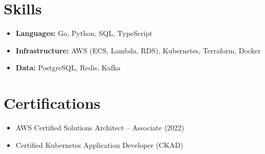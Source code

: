 \documentclass[11pt]{article}
\begin{document}
\section*{Skills}
\begin{itemize}
  \item \textbf{Languages:} Go, Python, SQL, TypeScript
  \item \textbf{Infrastructure:} AWS (ECS, Lambda, RDS), Kubernetes, Terraform, Docker
  \item \textbf{Data:} PostgreSQL, Redis, Kafka
\end{itemize}

\section*{Certifications}
\begin{itemize}
  \item AWS Certified Solutions Architect -- Associate (2022)
  \item Certified Kubernetes Application Developer (CKAD)
\end{itemize}
\end{document}
